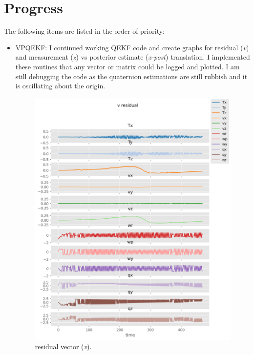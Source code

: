 \documentclass[11pt]{article}
\begin{document}
\section{Progress}
The following items are listed in the order of priority:
\begin{itemize}
      \item VPQEKF: I continued working QEKF code and create graphs for residual
      (\textit{v}) and measurement (\textit{z}) vs posterior estimate (\textit{x-post}) translation.
      I implemented these  routines that any vector or matrix could be logged and plotted.
      I am still debugging the code as the quaternion estimations are still rubbish and it is oscillating about the origin.

      \begin{figure}
            \includegraphics[width=\linewidth]{fig_09_v_residual.png}
            \caption{residual vector (\textit{v}).}
            \label{fig:residual}
      \end{figure}
      \begin{figure}

\end{figure}
\end{itemize}
\end{document}

